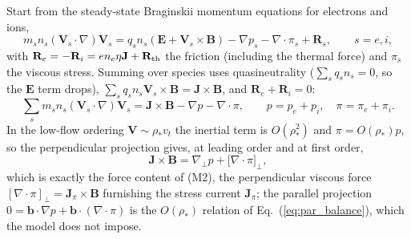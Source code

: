 \documentclass[english]{article}
\newcommand{\bB}{\mathbf{B}}
\newcommand{\bJ}{\mathbf{J}}
\newcommand{\bb}{\mathbf{b}}
\newcommand{\bE}{\mathbf{E}}
\newcommand{\bV}{\mathbf{V}}
\newcommand{\gradperp}{\nabla_{\!\perp}}
\begin{document}
Start from the steady-state Braginskii momentum equations for electrons and ions,
\begin{equation}
m_s n_s(\bV_s\cdot\nabla)\bV_s
=q_s n_s(\bE+\bV_s\times\bB)-\nabla p_s-\nabla\cdot\pi_s+\mathbf{R}_s ,
\qquad s=e,i ,
\label{eq:brag_momentum}
\end{equation}
with $\mathbf{R}_e=-\mathbf{R}_i=en_e\eta\bJ+\mathbf{R}_{\rm th}$ the friction (including the
thermal force) and $\pi_s$ the viscous stress. Summing over species uses quasineutrality
($\sum_s q_sn_s=0$, so the $\bE$ term drops), $\sum_s q_sn_s\bV_s\times\bB=\bJ\times\bB$, and
$\mathbf{R}_e+\mathbf{R}_i=0$:
\begin{equation}
\sum_s m_sn_s(\bV_s\cdot\nabla)\bV_s
=\bJ\times\bB-\nabla p-\nabla\cdot\pi ,
\qquad p=p_e+p_i,\quad \pi=\pi_e+\pi_i .
\label{eq:brag_total_momentum}
\end{equation}
In the low-flow ordering $\bV\sim\rho_* v_t$ the inertial term is $O(\rho_*^{2})$ and
$\pi=O(\rho_*)p$, so the perpendicular projection gives, at leading order and at first order,
\begin{equation}
\bJ\times\bB=\gradperp p+\big[\nabla\cdot\pi\big]_\perp ,
\label{eq:brag_perp}
\end{equation}
which is exactly the force content of (M2), the perpendicular viscous force
$[\nabla\cdot\pi]_\perp=\bJ_\pi\times\bB$ furnishing the stress current $\bJ_\pi$; the parallel
projection $0=\bb\cdot\nabla p+\bb\cdot(\nabla\cdot\pi)$ is the $O(\rho_*)$ relation of
Eq.~(\ref{eq:par_balance}), which the model does not impose.
\end{document}
